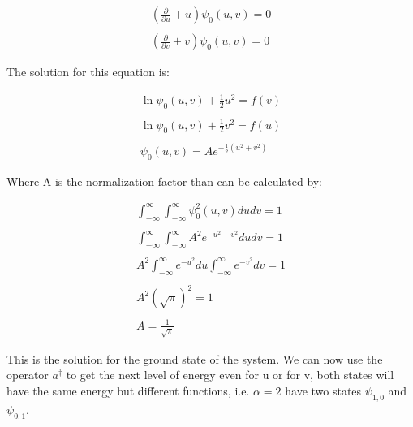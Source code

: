 \begin{equation}
  \begin{array}{c}
    \left(\frac{\partial}{\partial u} + u\right)\psi_0(u,v) = 0
    \\

    \\
    \left(\frac{\partial}{\partial v} + v\right)\psi_0(u,v) = 0
  \end{array}
\end{equation}

The solution for this equation is:

\begin{equation}
  \begin{array}{c}
    \ln\psi_0(u,v) + \frac{1}{2}u^2 = f(v)
    \\

    \\
    \ln\psi_0(u,v) + \frac{1}{2}v^2 = f(u)
    \\

    \\
    \psi_0(u,v) = A e^{-\frac{1}{2}(u^2+v^2)}
  \end{array}
\end{equation}

Where A is the normalization factor than can be calculated by:

\begin{equation}
  \begin{array}{c}
    \int_{-\infty}^{\infty}\int_{-\infty}^{\infty} \psi_0^2(u,v) du dv = 1
    \\

    \\
    \int_{-\infty}^{\infty}\int_{-\infty}^{\infty} A^2 e^{-u^2-v^2} du dv = 1
    \\

    \\
    A^2 \int_{-\infty}^{\infty} e^{-u^2} du \int_{-\infty}^{\infty} e^{-v^2} dv = 1
    \\

    \\
    A^2 \left(\sqrt{\pi}\right)^2 = 1
    \\

    \\
    A = \frac{1}{\sqrt{\pi}}
  \end{array}
\end{equation}

This is the solution for the ground state of the system. We can now use the operator $a^{\dagger}$ to get the next level of energy even for u or for v, both states will have the same energy but different functions, i.e. $\alpha=2$ have two states $\psi_{1,0}$ and $\psi_{0,1}$.


